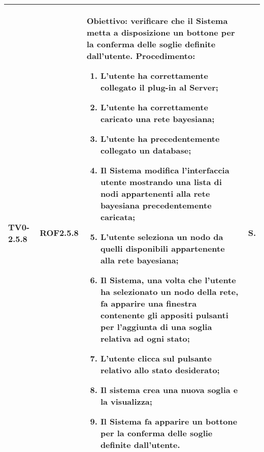 \begin{longtable}{|C{.15\textwidth}|C{.13\textwidth}|m{.65\textwidth}|C{.08\textwidth}|}
TV0-2.5.8 & ROF2.5.8 &
	\textbf{Obiettivo}: verificare che il Sistema metta a disposizione un bottone per la conferma delle soglie definite dall'utente. \newline
	\textbf{Procedimento}:
	\begin{enumerate}
		\item L'utente ha correttamente collegato il plug-in al Server;
		\item L'utente ha correttamente caricato una rete bayesiana;
		\item L'utente ha precedentemente collegato un database;
		\item Il Sistema modifica l'interfaccia utente mostrando una lista di nodi appartenenti alla rete bayesiana precedentemente caricata;
		\item L'utente seleziona un nodo da quelli disponibili appartenente alla rete bayesiana;
		\item Il Sistema, una volta che l'utente ha selezionato un nodo della rete, fa apparire una finestra contenente gli appositi pulsanti per l'aggiunta di una soglia relativa ad ogni stato;
		\item L'utente clicca sul pulsante relativo allo stato desiderato;
		\item Il sistema crea una nuova soglia e la visualizza;
		\item Il Sistema fa apparire un bottone per la conferma delle soglie definite dall'utente.
	\end{enumerate}
	& S. \\
\hline


\end{longtable}
